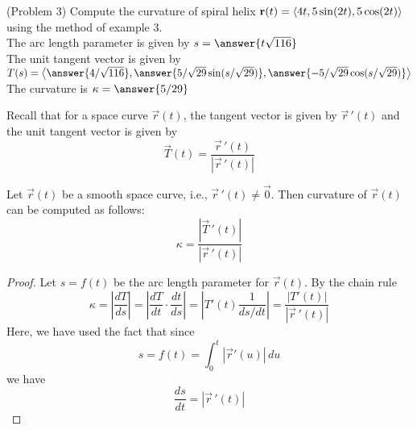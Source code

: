 \documentclass[handout]{ximera}
\begin{document}
\begin{problem}(Problem 3)
Compute the curvature of spiral helix $\mathbf r(t) = \left\langle 4t, 5 \sin(2t),5\cos(2t)\right\rangle$ using the method of example 3.\\
The arc length parameter is given by $s = \answer{t\sqrt{116}}$\\
The unit tangent vector is given by $T(s) = \vector{\answer{4/\sqrt{116}}, \answer{5/\sqrt{29} \sin(s/\sqrt{29})}, \answer{-5/\sqrt{29} \cos(s/\sqrt{29})}}$\\
The curvature is $\kappa = \answer{5/29}$
\end{problem}

Recall that for a space curve $\vec r(t)$, the tangent vector is given by $\vec r\,'(t)$ and the unit tangent vector is given by
\[
\vec T(t) = \frac{\vec r\,'(t)}{|\vec r\,'(t)|}
\]

\begin{proposition}
Let $\vec r(t)$ be a smooth space curve, i.e., $\vec r\,'(t) \neq \vec 0$. Then curvature of $\vec r(t)$ can be computed as follows:
\[
\kappa = \frac{|\vec T\,'(t)|}{|\vec r\,'(t)|}
\]
\end{proposition}
\begin{proof}
Let $s = f(t)$ be the arc length parameter for $\vec r(t)$. By the chain rule
\[
\kappa = \left|\frac{dT}{ds}\right| = \left|\frac{dT}{dt} \cdot \frac{dt}{ds}\right| = \left|T'(t) \frac{1}{ds/dt}\right| = \frac{|T'(t)|}{|\vec r\,'(t)|}
\]
Here, we have used the fact that since
\[
s = f(t) = \int_0^t |\vec r'(u)| \, du
\]
we have
\[
\frac{ds}{dt} = |\vec r\,'(t)|
\]
\end{proof}
\end{document}
